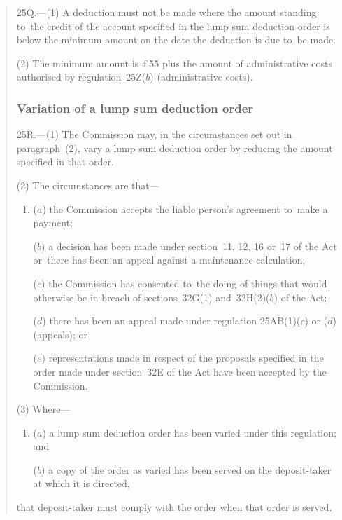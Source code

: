 \documentclass[12pt,a4paper]{article}
\begin{document}
\begin{quotation}
25Q.---(1)  A deduction must not be made where the amount standing to~the credit of the account specified in the lump sum deduction order is below the minimum amount on the date the deduction is due to~be made.

(2) The minimum amount is £55 plus the amount of administrative costs authorised by regulation~25Z($b$)  (administrative costs).

\subsubsection*{Variation of a lump sum deduction order}

25R.---(1)  The Commission may, in the circumstances set out in paragraph~(2), vary a lump sum deduction order by reducing the amount specified in that order.

(2) The circumstances are that—
\begin{enumerate}\item[]
($a$) the Commission accepts the liable person’s agreement to~make a payment;

($b$) a decision has been made under section~11, 12, 16 or~17 of the Act or~there has been an appeal against a maintenance calculation;

\begin{sloppypar}
($c$) the Commission has consented to~the doing of things that would otherwise be in breach of sections~32G(1) and~32H(2)($b$)  of the Act;
\end{sloppypar}

\begin{sloppypar}
($d$) there has been an appeal made under regulation 25AB(1)($c$)  or ($d$)  (appeals); or
\end{sloppypar}

($e$) representations made in respect of the proposals specified in the order made under section~32E of the Act have been accepted by the Commission.
\end{enumerate}

(3) Where—
\begin{enumerate}\item[]
($a$) a lump sum deduction order has been varied under this regulation; and

($b$) a copy of the order as varied has been served on the deposit-taker at which it is directed,
\end{enumerate}
that deposit-taker must comply with the order when that order is served.


\end{quotation}
\end{document}
